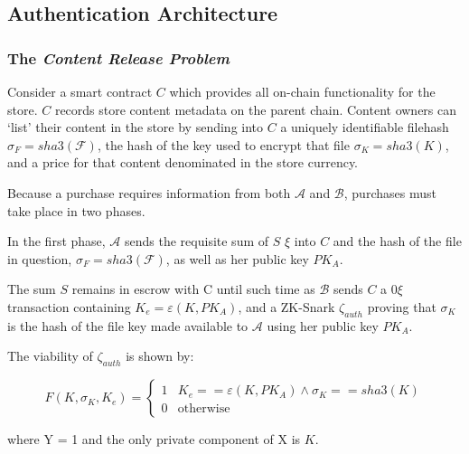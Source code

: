 \documentclass[12pt,oneside]{amsart}
\def\file{\mathcal{F}}
\def\hash{sha3}
\def\alice{\mathcal{A}}
\def\bob{\mathcal{B}}
\def\ether{\xi}
\def\zksnark{\zeta}
\def\encrypt{\varepsilon}
\def\crp{\textit{Content Release Problem} }
\begin{document}
\subsection{Authentication Architecture}

\subsubsection{The \crp}

Consider a smart contract $C$ which provides all on-chain functionality for the store.
$C$ records store content metadata on the parent chain.
Content owners can `list' their content in the store by sending into $C$ a uniquely identifiable filehash $\sigma_F = \hash(\file)$, the hash of the key used to encrypt that file $\sigma_K = \hash(K)$, and a price for that content denominated in the store currency.

Because a purchase requires information from both $\alice$ and $\bob$, purchases must take place in two phases.

In the first phase, $\alice$ sends the requisite sum of $S$ $\ether$ into $C$ and the hash of the file in question, $\sigma_F = \hash(\file)$, as well as her public key $PK_A$.

The sum $S$ remains in escrow with C until such time as $\bob$ sends $C$ a $0\ether$ transaction containing $K_e = \encrypt(K, PK_A)$, and
a ZK-Snark $\zksnark_{auth}$ proving that $\sigma_K$ is the hash of the file key made available to $\alice$ using her public key $PK_A$.

The viability of $\zksnark_{auth}$ is shown by:

\[
F(K, \sigma_K, K_e) =
  \begin{cases}
    1 & K_e == \encrypt(K, PK_A) \wedge \sigma_K == \hash(K) \\
    0 & \text{otherwise}
  \end{cases}
\]

where Y = 1 and the only private component of X is $K$.
\end{document}
